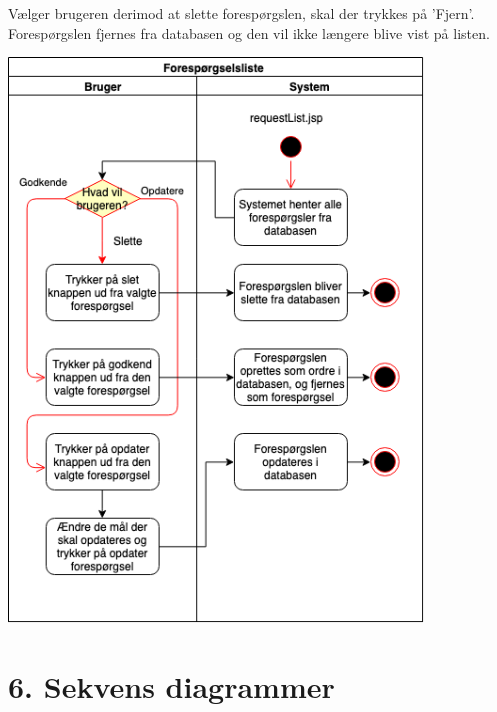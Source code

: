 \documentclass[11pt]{report}
\begin{document}
Vælger brugeren derimod at slette forespørgslen, skal der trykkes på ’Fjern’. Forespørgslen fjernes fra databasen og den vil ikke længere blive vist på listen. \\
\begin{center}
\includegraphics[width=11cm]{Foresporgselsliste.png}
\end{center}

\newpage

\chapter*{6. Sekvens diagrammer}
\end{document}
